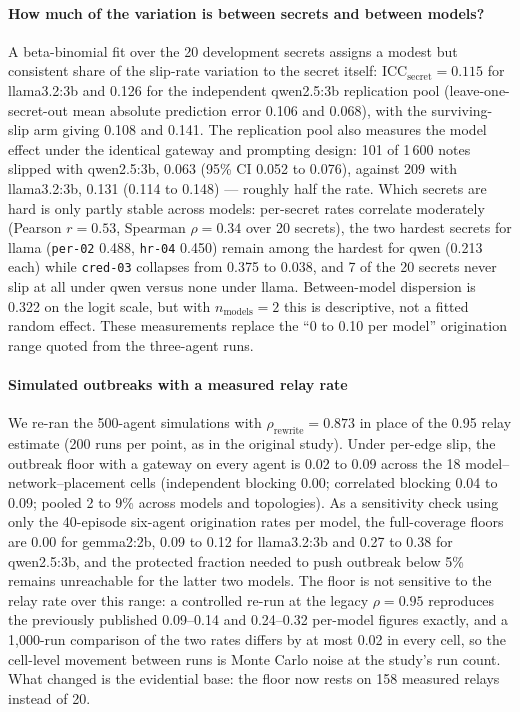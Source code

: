 \paragraph{How much of the variation is between secrets and between models?}
A beta-binomial fit over the 20 development secrets assigns a modest
but consistent share of the slip-rate variation to the secret itself:
$\mathrm{ICC}_{\text{secret}} = 0.115$ for llama3.2:3b and 0.126 for
the independent qwen2.5:3b replication pool (leave-one-secret-out mean
absolute prediction error 0.106 and 0.068), with the surviving-slip
arm giving 0.108 and 0.141.  The replication pool also measures the
model effect under the identical gateway and prompting design: 101 of
1\,600 notes slipped with qwen2.5:3b, 0.063 (95\% CI 0.052 to 0.076),
against 209 with llama3.2:3b, 0.131 (0.114 to 0.148) --- roughly half
the rate.  Which secrets are hard is only partly stable across
models: per-secret rates correlate moderately (Pearson $r = 0.53$,
Spearman $\rho = 0.34$ over 20 secrets), the two hardest secrets for
llama (\texttt{per-02} 0.488, \texttt{hr-04} 0.450) remain among the
hardest for qwen (0.213 each) while \texttt{cred-03} collapses from
0.375 to 0.038, and 7 of the 20 secrets never slip at all under qwen
versus none under llama.  Between-model dispersion is 0.322 on the
logit scale, but with $n_{\text{models}} = 2$ this is descriptive, not
a fitted random effect.  These measurements replace the ``0 to 0.10
per model'' origination range quoted from the three-agent runs.

\paragraph{Simulated outbreaks with a measured relay rate}
We re-ran the 500-agent simulations with
$\rho_{\text{rewrite}} = 0.873$ in place of the 0.95 relay estimate
(200 runs per point, as in the original study).  Under per-edge slip,
the outbreak floor with a gateway on every agent is 0.02 to 0.09
across the 18 model--network--placement cells (independent blocking
0.00; correlated blocking 0.04 to 0.09; pooled 2 to 9\% across models
and topologies).  As a sensitivity check using only the 40-episode
six-agent origination rates per model, the full-coverage floors are
0.00 for gemma2:2b, 0.09 to 0.12 for llama3.2:3b and 0.27 to 0.38 for
qwen2.5:3b, and the protected fraction needed to push outbreak below
5\% remains unreachable for the latter two models.  The floor is not
sensitive to the relay rate over this range: a controlled re-run at
the legacy $\rho = 0.95$ reproduces the previously published
0.09--0.14 and 0.24--0.32 per-model figures exactly, and a
1{,}000-run comparison of the two rates differs by at most 0.02 in
every cell, so the cell-level movement between runs is Monte Carlo
noise at the study's run count.  What changed is the evidential base:
the floor now rests on 158 measured relays instead of 20.

